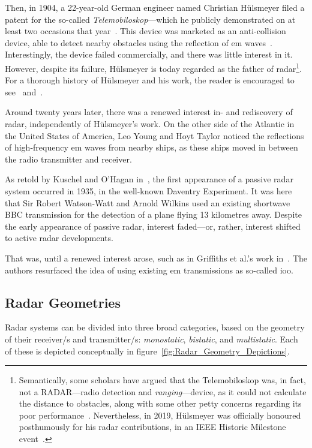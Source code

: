 \documentclass[class=report,11pt,crop=false]{standalone}
\begin{document}
Then, in 1904, a 22-year-old German engineer named Christian H\"ulsmeyer filed a patent for the so-called \emph{Telemobiloskop}---which he publicly demonstrated on at least two occasions that year~\cite{Galati2014}. This device was marketed as an anti-collision device, able to detect nearby obstacles using the reflection of \gls{em} waves~\cite{swords1986technical}. Interestingly, the device failed commercially, and there was little interest in it. However, despite its failure, H\"ulsmeyer is today regarded as the father of radar\footnote{Semantically, some scholars have argued that the Telemobiloskop was, in fact, not a RADAR---radio detection and \emph{ranging}---device, as it could not calculate the distance to obstacles, along with some other petty concerns regarding its poor performance~\cite{pritchard1989radar}. Nevertheless, in 2019, H\"ulsmeyer was officially honoured posthumously for his radar contributions, in an IEEE Historic Milestone event~\cite{Griffiths2019}.}. For a thorough history of H\"ulsmeyer and his work, the reader is encouraged to see~\cite{pritchard1989radar} and~\cite{bauer2005christian}.

Around twenty years later, there was a renewed interest in- and rediscovery of radar, independently of H\"ulsmeyer's work. On the other side of the Atlantic in the United States of America, Leo Young and Hoyt Taylor noticed the reflections of high-frequency \gls{em} waves from nearby ships, as these ships moved in between the radio transmitter and receiver.

As retold by Kuschel and O'Hagan in~\cite{kuschel-hagan-history}, the first appearance of a passive radar system occurred in 1935, in the well-known Daventry Experiment. It was here that Sir Robert Watson-Watt and Arnold Wilkins used an existing shortwave BBC transmission for the detection of a plane flying 13 kilometres away. Despite the early appearance of passive radar, interest faded---or, rather, interest shifted to active radar developments.

That was, until a renewed interest arose, such as in Griffiths et al.'s work in~\cite{Griffiths1992}. The authors resurfaced the idea of using existing \gls{em} transmissions as so-called \gls{ioo}.


\subsection{Radar Geometries}

Radar systems can be divided into three broad categories, based on the geometry of their receiver/s and transmitter/s: \emph{monostatic}, \emph{bistatic}, and \emph{multistatic}. Each of these is depicted conceptually in figure~\ref{fig:Radar_Geometry_Depictions}.
\end{document}
